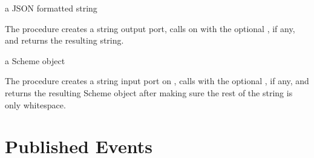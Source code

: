 \begin{procedure}
\end{procedure}
\returns{} a JSON formatted string

The  procedure creates a string output
port, calls  on  with the optional
, if any, and returns the resulting string.

\begin{procedure}
\end{procedure}
\returns{} a Scheme object

The  procedure creates a string input port
on , calls  with the optional ,
if any, and returns the resulting Scheme object after making sure the rest
of the string is only whitespace.

\section {Published Events}

\begin{event}\end{event}\antipar
\begin{argtbl}
\end{argtbl}
